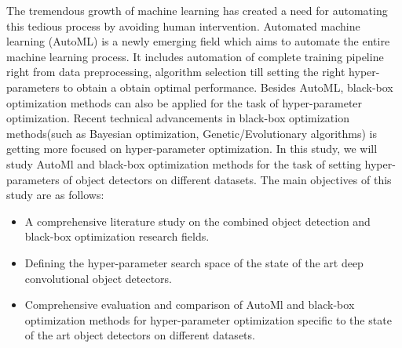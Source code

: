 \documentclass[thesis]{mas_proposal}
\begin{document}
The tremendous growth of machine learning has created a need for automating this tedious process by avoiding human intervention. Automated machine learning (AutoML) is a newly emerging field which aims to automate the entire machine learning process. It includes automation of complete training pipeline right from data preprocessing, algorithm selection till setting the right hyper-parameters to obtain a obtain optimal performance\cite{automl_book}. Besides AutoML, black-box optimization methods can also be applied for the task of hyper-parameter optimization. Recent technical advancements in black-box optimization methods(such as Bayesian optimization, Genetic/Evolutionary algorithms) is getting more focused on hyper-parameter optimization. In this study, we will study AutoMl and black-box optimization methods for the task of setting hyper-parameters of object detectors on different datasets.
The main objectives of this study are as follows: 
\begin{itemize}
    \item A comprehensive literature study on the combined object detection and black-box optimization research fields.
    \item Defining the hyper-parameter search space of the state of the art deep convolutional object detectors.
    \item Comprehensive evaluation and comparison of  AutoMl and black-box optimization methods for hyper-parameter optimization specific to the state of the art object detectors on different datasets.
\end{itemize}
    
    
\end{document}
